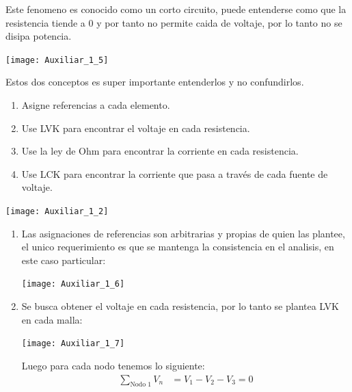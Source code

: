 \documentclass[
  11pt,
  letterpaper,
   addpoints,
   answers
  ]{exam}
\begin{document}
\begin{questions}
\begin{solution}
\begin{itemize}
\begin{equation}
        \end{equation}
        Este fenomeno es conocido como un corto circuito, puede entenderse como que la resistencia tiende a 0 y por tanto no permite caida de voltaje, por lo tanto no se disipa potencia.
        \begin{center}
            \texttt{[image: Auxiliar\_1\_5]}
        \end{center}
        Estos dos conceptos es super importante entenderlos y no confundirlos.
    \end{itemize}
    \end{solution}
\question  
\begin{enumerate}
    En base a la figura del enunciado:
    \item Asigne referencias a cada elemento.
    \item Use LVK para encontrar el voltaje en cada resistencia.
    \item Use la ley de Ohm para encontrar la corriente en cada resistencia.
    \item Use LCK para encontrar la corriente que pasa a través de cada fuente de voltaje.
\end{enumerate}
\begin{center}
    \texttt{[image: Auxiliar\_1\_2]}
\end{center}
\begin{solution}
   \begin{enumerate}
    \item Las asignaciones de referencias son arbitrarias y propias de quien las plantee, el unico requerimiento es que se mantenga la consistencia en el analisis, en este caso particular:
    \begin{center}
        \texttt{[image: Auxiliar\_1\_6]}
    \end{center}
    \item Se busca obtener el voltaje en cada resistencia, por lo tanto se plantea LVK en cada malla:
    \begin{center}
        \texttt{[image: Auxiliar\_1\_7]}
    \end{center}
    Luego para cada nodo tenemos lo siguiente:
    \begin{align}
        \sum_{\text{Nodo 1}} V_{n} &= V_{1} - V_{2} - V_{3} = 0\\

\end{align}
\end{enumerate}
\end{solution}
\end{questions}
\end{document}
